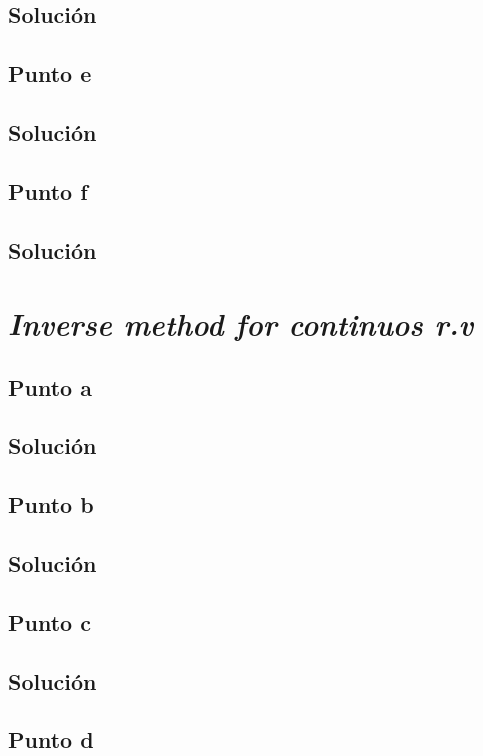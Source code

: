 \documentclass[12pt]{article}
\begin{document}
\subsection{Solución}

\subsection{Punto e}
\subsection{Solución}

\subsection{Punto f}
\subsection{Solución}


\section{\textit{Inverse method for continuos r.v}}

\subsection{Punto a}
\subsection{Solución}

\subsection{Punto b}
\subsection{Solución}

\subsection{Punto c}
\subsection{Solución}

\subsection{Punto d}
\end{document}
